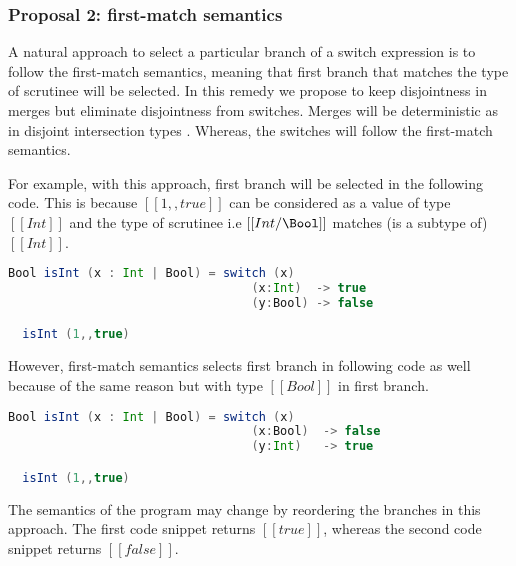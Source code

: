 
\subsubsection{Proposal 2: first-match semantics}

A natural approach to select a particular branch of a switch
expression is to follow the first-match semantics,
meaning that first branch that matches the type
of scrutinee will be selected.
In this remedy we propose to keep disjointness in merges but
eliminate disjointness from switches. Merges will be deterministic
as in disjoint intersection types \cite{oliveira2016disjoint}.
Whereas, the switches will follow the first-match semantics.

\noindent For example, with this approach, first branch will be
selected in the following code. This is because $[[1,,true]]$
can be considered as a value of type $[[Int]]$ and the type
of scrutinee i.e $[[Int/\Bool]]$ matches (is a subtype of) 
$[[Int]]$.

\begin{lstlisting}[language=Scala]
  Bool isInt (x : Int | Bool) = switch (x)
                                  (x:Int)  -> true
                                  (y:Bool) -> false

  isInt (1,,true)
\end{lstlisting}

\noindent However, first-match semantics selects first 
branch in following code as well because of the same
reason but with type $[[Bool]]$ in first branch.

\begin{lstlisting}[language=Scala]
  Bool isInt (x : Int | Bool) = switch (x)
                                  (x:Bool)  -> false
                                  (y:Int)   -> true

  isInt (1,,true)
\end{lstlisting}

\noindent The semantics of the
program may change by reordering the branches in this approach.
The first code snippet returns $[[true]]$, whereas the second
code snippet returns $[[false]]$.

